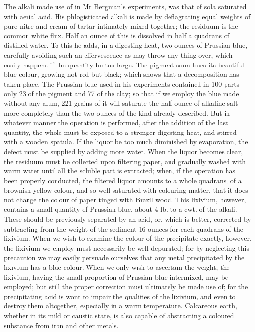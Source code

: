 \documentclass{article}
\begin{document}
The alkali made use of in Mr Bergman's experiments, was that of sola saturated with aerial acid. His phlogisticated alkali is made by deflagrating equal weights of pure nitre and cream of tartar intimately mixed together; the residuum is the common white flux. Half an ounce of this is dissolved in half a quadrans of distilled water. To this he adds, in a digesting heat, two ounces of Prussian blue, carefully avoiding such an effervescence as may throw any thing over, which easily happens if the quantity be too large. The pigment soon loses its beautiful blue colour, growing not red but black; which shows that a decomposition has taken place. The Prussian blue used in his experiments contained in 100 parts only 23 of the pigment and 77 of the clay; so that if we employ the blue made without any alum, 221 grains of it will saturate the half ounce of alkaline salt more completely than the two ounces of the kind already described. But in whatever manner the operation is performed, after the addition of the last quantity, the whole must be exposed to a stronger digesting heat, and stirred with a wooden spatula. If the liquor be too much diminished by evaporation, the defect must be supplied by adding more water. When the liquor becomes clear, the residuum must be collected upon filtering paper, and gradually washed with warm water until all the soluble part is extracted; when, if the operation has been properly conducted, the filtered liquor amounts to a whole quadrans, of a brownish yellow colour, and so well saturated with colouring matter, that it does not change the colour of paper tinged with Brazil wood. This lixivium, however, contains a small quantity of Prussian blue, about 4 lb. to a cwt. of the alkali. These should be previously separated by an acid, or, which is better, corrected by subtracting from the weight of the sediment 16 ounces for each quadrans of the lixivium. When we wish to examine the colour of the precipitate exactly, however, the lixivium we employ must necessarily be well depurated; for by neglecting this precaution we may easily persuade ourselves that any metal precipitated by the lixivium has a blue colour. When we only wish to ascertain the weight, the lixivium, having the small proportion of Prussian blue intermixed, may be employed; but still the proper correction must ultimately be made use of; for the precipitating acid is wont to impair the qualities of the lixivium, and even to destroy them altogether, especially in a warm temperature. Calcareous earth, whether in its mild or caustic state, is also capable of abstracting a coloured substance from iron and other metals.
\end{document}
